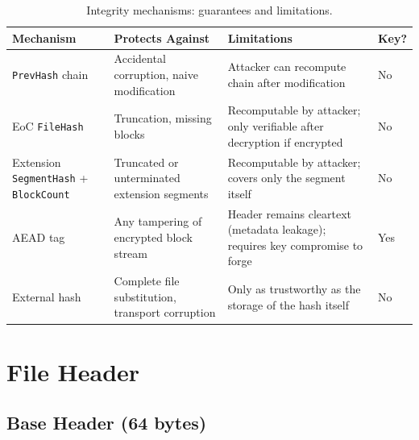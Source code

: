 \documentclass[11pt,a4paper]{article}
\newcommand{\field}[1]{\texttt{#1}}
\begin{document}
\begin{table}[H]\centering\caption{Integrity mechanisms: guarantees and limitations.}\label{tab:threatmodel}\small
\begin{tabular}{>{\raggedright\arraybackslash}p{3.6cm} p{3.4cm} p{4.6cm} l}\toprule\textbf{Mechanism}&\textbf{Protects Against}&\textbf{Limitations}&\textbf{Key?}\\\midrule
\field{PrevHash} chain & Accidental corruption, naive modification & Attacker can recompute chain after modification & No \\
EoC \field{FileHash} & Truncation, missing blocks & Recomputable by attacker; only verifiable after decryption if encrypted & No \\
Extension \field{SegmentHash} + \field{BlockCount} & Truncated or unterminated extension segments & Recomputable by attacker; covers only the segment itself & No \\
AEAD tag & Any tampering of encrypted block stream & Header remains cleartext (metadata leakage); requires key compromise to forge & Yes \\
External hash & Complete file substitution, transport corruption & Only as trustworthy as the storage of the hash itself & No \\
\bottomrule\end{tabular}\end{table}

\newpage
\section{File Header}\label{sec:fileheader}

\subsection{Base Header (64 bytes)}\label{sec:basehdr}
\end{document}
